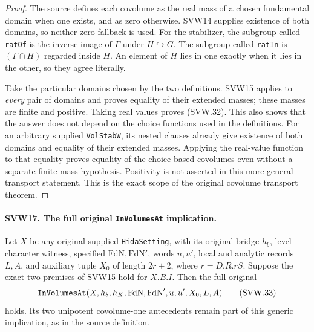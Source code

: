 \documentclass[11pt,a4paper]{article}
\numberwithin{equation}{section}
\theoremstyle{remark}\newtheorem{remark}[theorem]{Remark}
\begin{document}
\begin{proof}
The source defines each covolume as the real mass of a chosen
fundamental domain when one exists, and as zero otherwise.
SVW14 supplies existence of both domains, so neither zero fallback
is used.  For the stabilizer, the subgroup called \texttt{rat\allowbreak Of}
is the inverse image of $\Gamma$ under $H\hookrightarrow G$.
The subgroup called \texttt{rat\allowbreak In} is $(\Gamma\cap H)$ regarded
inside $H$.  An element of $H$ lies in one exactly when it lies
in the other, so they agree literally.

Take the particular domains chosen by the two definitions.
SVW15 applies to \emph{every} pair of domains and proves equality
of their extended masses; these masses are finite and positive.
Taking real values proves (SVW.32).  This also shows that the
answer does not depend on the choice functions used in the
definitions.  For an arbitrary supplied \texttt{Vol\allowbreak Stab\allowbreak W}, its
nested clauses already give existence of both domains and equality
of their extended masses.  Applying the real-value function to
that equality proves equality of the choice-based covolumes even
without a separate finite-mass hypothesis.  Positivity is not
asserted in this more general transport statement.  This is the
exact scope of the original covolume transport theorem.
\end{proof}

\paragraph{SVW17. The full original \texttt{In\allowbreak Volumes\allowbreak At} implication.}
\label{claim:SVW17}
Let $X$ be any original supplied \texttt{Hida\allowbreak Setting}, with its
original bridge $h_b$, level-character witness, specified
$\mathrm{FdN},\mathrm{FdN}'$, words $u,u'$, local and analytic
records $L,A$, and auxiliary tuple $X_0$ of length $2r+2$, where
$r=D.R.rS$.  Suppose the exact two premises of SVW15 hold for
$X.B.I$.  Then the full original
\[
 \texttt{In\allowbreak Volumes\allowbreak At}(X,h_b,h_K,\mathrm{FdN},\mathrm{FdN}',
                                    u,u',X_0,L,A)
 \tag{SVW.33}
\]
holds.  Its two unipotent covolume-one antecedents remain part of
this generic implication, as in the source definition.
\end{document}
